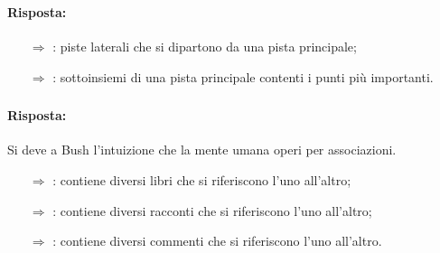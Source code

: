 \subsubsection{}


\paragraph{Risposta:}

\begin{itemize}
    \item [$\Rightarrow$] : piste laterali che si dipartono da una pista principale;
    \item [$\Rightarrow$] : sottoinsiemi di una pista principale contenti i punti più importanti.
\end{itemize}

\subsubsection{}


\paragraph{Risposta:} Si deve a Bush l'intuizione che la mente umana operi per associazioni.


\begin{itemize}
    \item [$\Rightarrow$] : contiene diversi libri che si riferiscono l'uno all'altro;
    \item [$\Rightarrow$] : contiene diversi racconti che si riferiscono l'uno all'altro;
    \item [$\Rightarrow$] : contiene diversi commenti che si riferiscono l'uno all'altro.
\end{itemize}

\subsubsection{}

